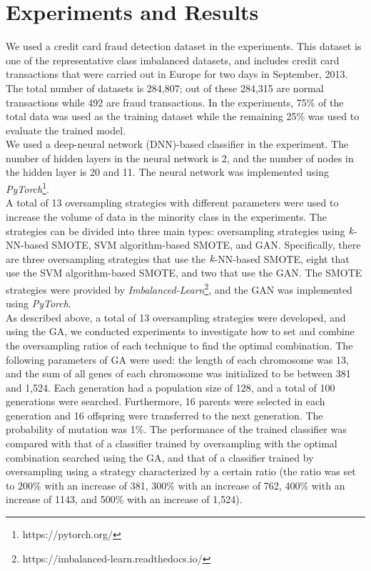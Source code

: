 \section{Experiments and Results}
\label{sec:experiments-results}
We used a credit card fraud detection dataset in the experiments.
This dataset is one of the representative class imbalanced datasets, and includes credit card transactions that were carried out in Europe for two days in September, 2013.
The total number of datasets is 284,807; out of these 284,315 are normal transactions while 492 are fraud transactions.
In the experiments, 75\% of the total data was used as the training dataset while the remaining 25\% was used to evaluate the trained model.\\
We used a deep-neural network (DNN)-based classifier in the experiment.
The number of hidden layers in the neural network is 2, and the number of nodes in the hidden layer is 20 and 11.
The neural network was implemented using \emph{PyTorch}\footnote{https://pytorch.org/}.\\
A total of 13 oversampling strategies with different parameters were used to increase the volume of data in the minority class in the experiments.
The strategies can be divided into three main types: oversampling strategies using $\emph{k}$-NN-based SMOTE, SVM algorithm-based SMOTE, and GAN.
Specifically, there are three oversampling strategies that use the $\emph{k}$-NN-based SMOTE, eight that use the SVM algorithm-based SMOTE, and two that use the GAN.
The SMOTE strategies were provided by \emph{Imbalanced-Learn}\footnote{https://imbalanced-learn.readthedocs.io/}, and the GAN was implemented using \emph{PyTorch}.\\
As described above, a total of 13 oversampling strategies were developed, and using the GA, we conducted experiments to investigate how to set and combine the oversampling ratios of each technique to find the optimal combination.
The following parameters of GA were used: the length of each chromosome was 13, and the sum of all genes of each chromosome was initialized to be between 381 and 1,524.
Each generation had a population size of 128, and a total of 100 generations were searched.
Furthermore, 16 parents were selected in each generation and 16 offspring were transferred to the next generation.
The probability of mutation was 1\%.
The performance of the trained classifier was compared with that of a classifier trained by oversampling with the optimal combination searched using the GA, and that of a classifier trained by oversampling using a strategy characterized by a certain ratio (the ratio was set to $200\%$ with an increase of 381, 300\% with an increase of 762, 400\% with an increase of 1143, and 500\% with an increase of 1,524).
